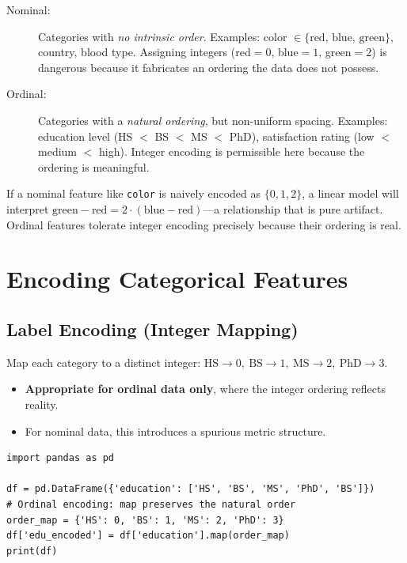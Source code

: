 \begin{description}
    \item[Nominal:] Categories with \emph{no intrinsic order}. Examples: color $\in \{\text{red, blue, green}\}$, country, blood type. Assigning integers (red$=0$, blue$=1$, green$=2$) is dangerous because it fabricates an ordering the data does not possess.
    \item[Ordinal:] Categories with a \emph{natural ordering}, but non-uniform spacing. Examples: education level (HS $<$ BS $<$ MS $<$ PhD), satisfaction rating (low $<$ medium $<$ high). Integer encoding is permissible here because the ordering is meaningful.
\end{description}

\begin{remark}
If a nominal feature like \texttt{color} is naively encoded as $\{0, 1, 2\}$, a linear model will interpret $\text{green} - \text{red} = 2 \cdot (\text{blue} - \text{red})$---a relationship that is pure artifact. Ordinal features tolerate integer encoding precisely because their ordering is real.
\end{remark}

\section*{Encoding Categorical Features}

\subsection*{Label Encoding (Integer Mapping)}

Map each category to a distinct integer: $\text{HS} \to 0,\ \text{BS} \to 1,\ \text{MS} \to 2,\ \text{PhD} \to 3$.

\begin{itemize}
    \item \textbf{Appropriate for ordinal data only}, where the integer ordering reflects reality.
    \item For nominal data, this introduces a spurious metric structure.
\end{itemize}

\begin{lstlisting}[style=pythonstyle]
import pandas as pd

df = pd.DataFrame({'education': ['HS', 'BS', 'MS', 'PhD', 'BS']})
# Ordinal encoding: map preserves the natural order
order_map = {'HS': 0, 'BS': 1, 'MS': 2, 'PhD': 3}
df['edu_encoded'] = df['education'].map(order_map)
print(df)
\end{lstlisting}

